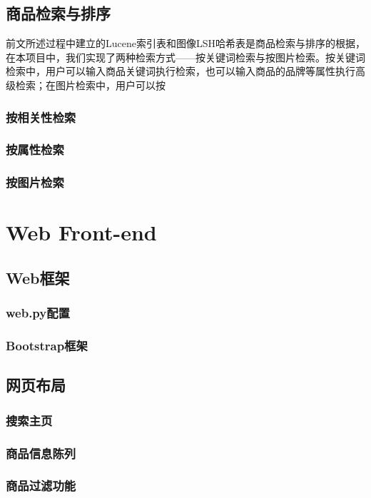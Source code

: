 
\chapter{商品检索与排序}

前文所述过程中建立的Lucene索引表和图像LSH哈希表是商品检索与排序的根据，在本项目中，我们实现了两种检索方式——按关键词检索与按图片检索。按关键词检索中，用户可以输入商品关键词执行检索，也可以输入商品的品牌等属性执行高级检索；在图片检索中，用户可以按



\section{按相关性检索}

\section{按属性检索}

\section{按图片检索}


\part{Web Front-end}

\chapter{Web框架}

\section{web.py配置}

\section{Bootstrap框架}


\chapter{网页布局}

\section{搜索主页}

\section{商品信息陈列}

\section{商品过滤功能}
